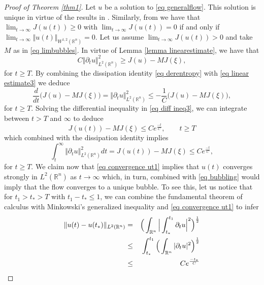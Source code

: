 \documentclass[11pt,letterpaper,reqno]{amsart}
\newcommand{\R}{\mathbb{R}}
\theoremstyle{plain}%
\theoremstyle{definition}
\numberwithin{equation}{section}
\numberwithin{figure}{section}
\begin{document}
\begin{proof}[Proof of Theorem \ref{thm1}]
   Let $u$ be a solution to \eqref{eq generalflow}. This solution is unique in virtue of the results in \cite{feireisl1997threshold}. Similarly, from \cite{feireisl1997threshold} we  have that $\lim_{t\to \infty} J(u(t)) \geq 0$ with $\lim_{t\to \infty} J(u(t)) = 0$ if and only if $\lim_{t\to \infty} \Vert u(t)\Vert_{W^{1,2}(\R^n)}=0$. Let us assume $\lim_{t\to \infty} J(u(t)) > 0$ and take  $M$ as in \eqref{eq limbubbles}. In virtue of Lemma \ref{lemma linearestimate}, we have that
\begin{equation}\label{eq linear estimate3}
C	\Vert \partial_t u\Vert^2_{L^2(\R^n)} \geq  J(u) -MJ(\xi),
\end{equation}
for $t \geq T$. By combining the dissipation identity \eqref{eq derentropy} with \eqref{eq linear estimate3} we deduce
\begin{equation}\label{eq diff ineq3}
\frac{d}{dt}\Big( J(u) -MJ(\xi)\Big)=  \Vert \partial_t u\Vert_{L^2(\R^n)}^2  \leq -\frac{1}{C}\Bigg( J(u) -MJ(\xi)\Bigg),
\end{equation}
for $t\geq T$. Solving the differential inequality in \eqref{eq diff ineq3}, we can integrate between $t>T$ and $\infty$ to deduce
\begin{equation}\label{eq convergence rate1}
	J(u(t))-MJ(\xi)\leq Ce^\frac{-t}{C}, \qquad{t\geq T}
\end{equation}
which combined with the dissipation identity implies
\begin{equation}\label{eq convergence ut1}
	\int_{t}^\infty \Vert \partial_t u\Vert_{L^2(\R^n)}^2 dt =J(u(t))-MJ(\xi)\leq Ce^\frac{-t}{C},
\end{equation}
for $t\geq T$. We claim now that \eqref{eq convergence ut1} implies that $u(t)$ converges strongly in $L^2(\R^n)$ as $t\to \infty$ which, in turn, combined with \eqref{eq bubbling} would imply that the flow converges to a unique bubble. To see this, let us notice that for $t_1>t_*>T$ with $t_1-t_*\leq 1$, we can combine the fundamental theorem of calculus with Minkowski's generalized inequality and \eqref{eq convergence ut1} to infer
\begin{eqnarray}\notag
	\Vert u(t) -u(t_*)\Vert_{L^{2}(\R^n)} &=& 	\Big(\int_{\R^n} \Big|\int_{t_*}^{t_1} \partial_t u \Big|^2\Big)^\frac{1}{2} \\\notag
	&\leq& \int_{t_*}^{t_1}\Big(\int_{\R^n} |\partial_t u|^2\Big)^\frac{1}{2}\\\label{eq Cauchy1}
		&\leq& Ce^\frac{-t_*}{C}
\end{eqnarray}

\end{proof}
\end{document}

